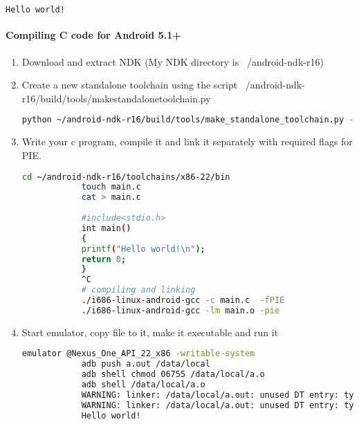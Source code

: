 \documentclass[../main.tex]{subfile}
\begin{document}
\begin{appendices}
\begin{enumerate}
\begin{lstlisting}[language=bash]
			Hello world!
			\end{lstlisting}
		\end{enumerate}		


		\paragraph{Compiling C code for Android 5.1+}
		\begin{enumerate}
			\item Download and extract NDK (My NDK directory is ~/android-ndk-r16)
			\item Create a new standalone toolchain using the script ~/android-ndk-r16/build/tools/make\textunderscore standalone\textunderscore toolchain.py
			\begin{lstlisting}[language=bash]
			python ~/android-ndk-r16/build/tools/make_standalone_toolchain.py --arch x86 --api 22 --install-dir ~/android-ndk-r16/toolchains/x86-22
			\end{lstlisting}
			\item Write your c program, compile it and link it separately with required flags for PIE.
			\begin{lstlisting}[language=bash]
			cd ~/android-ndk-r16/toolchains/x86-22/bin
			touch main.c
			cat > main.c
			
			#include<stdio.h>
			int main()
			{
			printf("Hello world!\n");
			return 0;
			}
			^C
			# compiling and linking
			./i686-linux-android-gcc -c main.c  -fPIE
			./i686-linux-android-gcc -lm main.o -pie
			\end{lstlisting}
			\item Start emulator, copy file to it, make it executable and run it
			\begin{lstlisting}[language=bash]
			emulator @Nexus_One_API_22_x86 -writable-system
			adb push a.out /data/local
			adb shell chmod 06755 /data/local/a.o
			adb shell /data/local/a.o
			WARNING: linker: /data/local/a.out: unused DT entry: type 0x6ffffffe arg 0x32c
			WARNING: linker: /data/local/a.out: unused DT entry: type 0x6fffffff arg 0x1
			Hello world!
			\end{lstlisting}
		\end{enumerate}
	\end{appendices}
\end{document}
